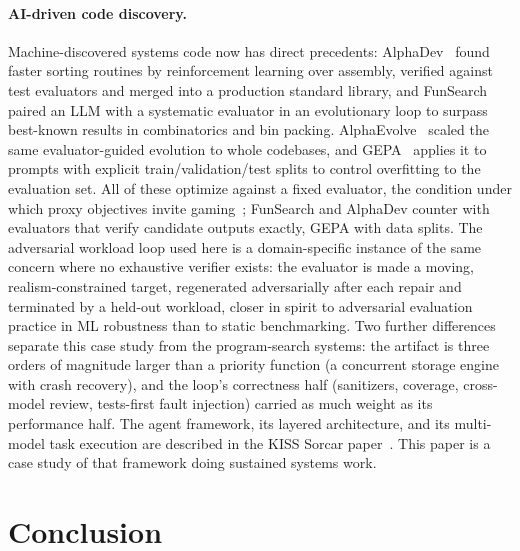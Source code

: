 \documentclass{article}
\begin{document}
\paragraph{AI-driven code discovery.} Machine-discovered systems code now has direct precedents: AlphaDev~\cite{alphadev} found faster sorting routines by reinforcement learning over assembly, verified against test evaluators and merged into a production standard library, and FunSearch~\cite{funsearch} paired an LLM with a systematic evaluator in an evolutionary loop to surpass best-known results in combinatorics and bin packing. AlphaEvolve~\cite{alphaevolve} scaled the same evaluator-guided evolution to whole codebases, and GEPA~\cite{gepa} applies it to prompts with explicit train/validation/test splits to control overfitting to the evaluation set. All of these optimize against a fixed evaluator, the condition under which proxy objectives invite gaming~\cite{rewardhacking}; FunSearch and AlphaDev counter with evaluators that verify candidate outputs exactly, GEPA with data splits. The adversarial workload loop used here is a domain-specific instance of the same concern where no exhaustive verifier exists: the evaluator is made a moving, realism-constrained target, regenerated adversarially after each repair and terminated by a held-out workload, closer in spirit to adversarial evaluation practice in ML robustness than to static benchmarking. Two further differences separate this case study from the program-search systems: the artifact is three orders of magnitude larger than a priority function (a concurrent storage engine with crash recovery), and the loop's correctness half (sanitizers, coverage, cross-model review, tests-first fault injection) carried as much weight as its performance half. The agent framework, its layered architecture, and its multi-model task execution are described in the KISS Sorcar paper~\cite{kisssorcar}. This paper is a case study of that framework doing sustained systems work.

\section{Conclusion}
\label{sec:conclusion}
\end{document}
